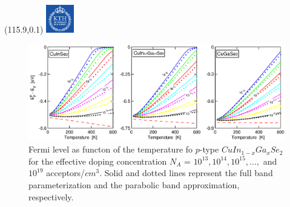 \documentclass[]{beamer}
\newcommand{\MyLogo}{%
\begin{textblock}{14}(115.9,0.1)
  \includegraphics[width=1.22cm]{kth_rgb}
 \end{textblock}
}
\begin{document}



\begin{frame}
\MyLogo
\begin{figure}[H]
    \begin{center}
            \includegraphics[width=1\textwidth,clip]{seminar/fermi_level_with_temperature}
     \end{center}
    \caption{Fermi level as functon of the temperature fo $p$-type $CuIn_{1-x}Ga_xSe_2$ for the effective doping concentration $N_A$ = $10^{13}, 10^{14}, 10^{15}, ... , $ and $10^{19}$ acceptors/$cm^3$. Solid and dotted lines represent the full band parameterization and the parabolic band approximation, respectively.}
\end{figure}
\end{frame}
\end{document}
